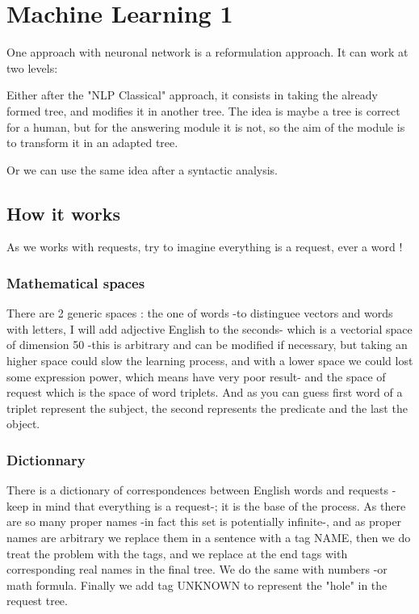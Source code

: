 \section{Machine Learning 1}

One approach with neuronal network is a reformulation approach. It can work at two levels: 

Either after the "NLP Classical" approach, it consists in taking the already formed tree, and modifies it in another tree. The idea is maybe a tree is correct for a human, but for the answering module it is not, so the aim of the module is to transform it in an adapted tree.

Or we can use the same idea after a syntactic analysis. 

\subsection{How it works}

As we works with requests, try to imagine everything is a request, ever a word !

\subsubsection{Mathematical spaces}

There are 2 generic spaces : the one of words -to distinguee vectors and words with letters, I will add adjective English to the seconds- which is a vectorial space of dimension 50 -this is arbitrary and can be modified if necessary, but taking an higher space could slow the learning process, and with a lower space we could lost some expression power, which means have very poor result- and the space of request which is the space of word triplets. And as you can guess first word of a triplet represent the subject, the second represents the predicate and the last the object.

\subsubsection{Dictionnary}

There is a dictionary of correspondences between English words and requests -keep in mind that everything is a request-; it is the base of the process. As there are so many proper names -in fact this set is potentially infinite-, and as proper names are arbitrary we replace them in a sentence with a tag NAME, then we do treat the problem with the tags, and we replace at the end tags with corresponding real names in the final tree. We do the same with numbers -or math formula. Finally we add tag UNKNOWN to represent the "hole" in the request tree.

